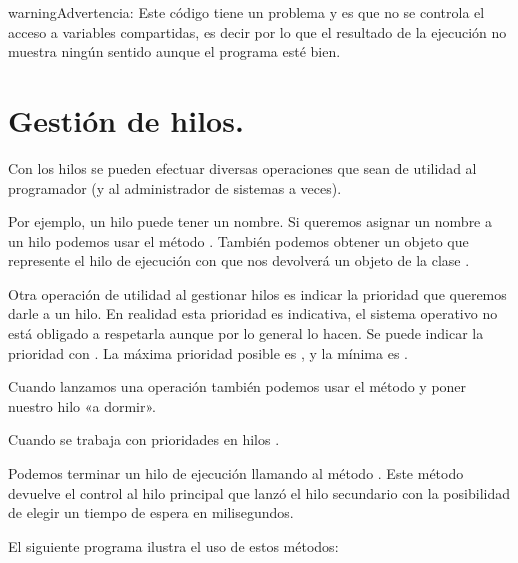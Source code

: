 \documentclass[letterpaper,10pt,spanish]{sphinxmanual}
\begin{document}
\begin{sphinxadmonition}{warning}{Advertencia:}
Este código tiene un problema  y es que no se controla el acceso a variables compartidas, es decir  por lo que el resultado de la ejecución no muestra ningún sentido aunque el programa esté bien.
\end{sphinxadmonition}


\section{Gestión de hilos.}
\label{\detokenize{textos/tema2:gestion-de-hilos}}
Con los hilos se pueden efectuar diversas operaciones que sean de utilidad al programador (y al administrador de sistemas a veces).

Por ejemplo, un hilo puede tener un nombre. Si queremos asignar un nombre a un hilo podemos usar el método . También podemos obtener un objeto que represente el hilo de ejecución con  que nos devolverá un objeto de la clase .

Otra operación de utilidad al gestionar hilos es indicar la prioridad que queremos darle a un hilo. En realidad esta prioridad es indicativa, el sistema operativo no está obligado a respetarla aunque por lo general lo hacen. Se puede indicar la prioridad con . La máxima prioridad posible es , y la mínima es .

Cuando lanzamos una operación también podemos usar el método  y poner nuestro hilo «a dormir».

Cuando se trabaja con prioridades en hilos .

Podemos terminar un hilo de ejecución llamando al método . Este método devuelve el control al hilo principal que lanzó el hilo secundario con la posibilidad de elegir un tiempo de espera en milisegundos.

El siguiente programa ilustra el uso de estos métodos:
\end{document}
